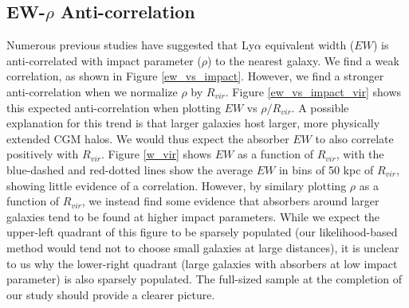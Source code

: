 \documentclass[iop]{emulateapj-rtx4}
\begin{document}
%


\vspace{10pt}


\subsection{EW-$\rho$ Anti-correlation}
Numerous previous studies have suggested that Ly$\alpha$ equivalent width ($EW$) is anti-correlated with impact parameter ($\rho$) to the nearest galaxy. We find a weak correlation, as shown in Figure \ref{ew_vs_impact}. However, we find a stronger anti-correlation when we normalize $\rho$ by $R_{vir}$. Figure \ref{ew_vs_impact_vir} shows this expected anti-correlation when plotting $EW$ vs $\rho/R_{vir}$. A possible explanation for this trend is that larger galaxies host larger, more physically extended CGM halos. We would thus expect the absorber $EW$ to also correlate positively with $R_{vir}$. Figure \ref{w_vir} shows $EW$ as a function of $R_{vir}$, with the blue-dashed and red-dotted lines show the average $EW$ in bins of 50 kpc of $R_{vir}$, showing little evidence of a correlation. However, by similary plotting $\rho$ as a function of $R_{vir}$, we instead find some evidence that absorbers around larger galaxies tend to be found at higher impact parameters. While we expect the upper-left quadrant of this figure to be sparsely populated (our likelihood-based method would tend not to choose small galaxies at large distances), it is unclear to us why the lower-right quadrant (large galaxies with absorbers at low impact parameter) is also sparsely populated. The full-sized sample at the completion of our study should provide a clearer picture.
\end{document}
